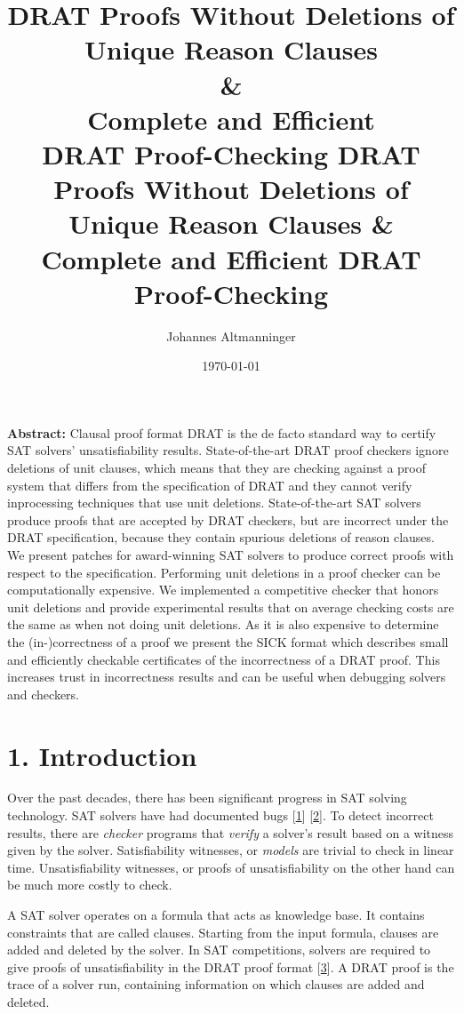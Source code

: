 \documentclass[
]{report}
\title{
    DRAT Proofs Without Deletions of \\ Unique Reason Clauses \\
    \&\\
    Complete and Efficient \\ DRAT Proof-Checking
}
\title{DRAT Proofs Without Deletions of Unique Reason Clauses \& Complete and
Efficient DRAT Proof-Checking}
\author{Johannes Altmanninger}
\date{\today}
\begin{document}
\maketitle

\textbf{Abstract:} Clausal proof format DRAT is the de facto standard
way to certify SAT solvers' unsatisfiability results. State-of-the-art
DRAT proof checkers ignore deletions of unit clauses, which means that
they are checking against a proof system that differs from the
specification of DRAT and they cannot verify inprocessing techniques
that use unit deletions. State-of-the-art SAT solvers produce proofs
that are accepted by DRAT checkers, but are incorrect under the DRAT
specification, because they contain spurious deletions of reason
clauses. We present patches for award-winning SAT solvers to produce
correct proofs with respect to the specification. Performing unit
deletions in a proof checker can be computationally expensive. We
implemented a competitive checker that honors unit deletions and provide
experimental results that on average checking costs are the same as when
not doing unit deletions. As it is also expensive to determine the
(in-)correctness of a proof we present the SICK format which describes
small and efficiently checkable certificates of the incorrectness of a
DRAT proof. This increases trust in incorrectness results and can be
useful when debugging solvers and checkers.

\tableofcontents

\hypertarget{introduction}{%
\chapter{1. Introduction}\label{introduction}}

Over the past decades, there has been significant progress in SAT
solving technology. SAT solvers have had documented bugs
{[}\protect\hyperlink{ref-BrummayerBiere-SMT09}{1}{]}
{[}\protect\hyperlink{ref-BrummayerLonsingBiere-SAT10}{2}{]}. To detect
incorrect results, there are \emph{checker} programs that \emph{verify}
a solver's result based on a witness given by the solver. Satisfiability
witnesses, or \emph{models} are trivial to check in linear time.
Unsatisfiability witnesses, or proofs of unsatisfiability on the other
hand can be much more costly to check.

A SAT solver operates on a formula that acts as knowledge base. It
contains constraints that are called clauses. Starting from the input
formula, clauses are added and deleted by the solver. In SAT
competitions, solvers are required to give proofs of unsatisfiability in
the DRAT proof format {[}\protect\hyperlink{ref-Heule_2014}{3}{]}. A
DRAT proof is the trace of a solver run, containing information on which
clauses are added and deleted.
\end{document}

